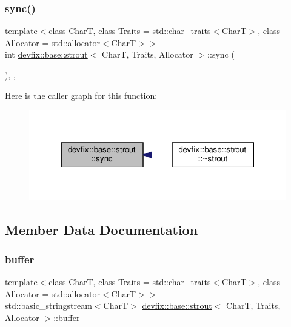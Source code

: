 \subsubsection{\texorpdfstring{sync()}{sync()}}
{\footnotesize\ttfamily template$<$class CharT, class Traits = std\+::char\+\_\+traits$<$\+Char\+T$>$, class Allocator = std\+::allocator$<$\+Char\+T$>$$>$ \\
int \hyperlink{structdevfix_1_1base_1_1strout}{devfix\+::base\+::strout}$<$ CharT, Traits, Allocator $>$\+::sync (\begin{DoxyParamCaption}{ }\end{DoxyParamCaption})\hspace{0.3cm}{\ttfamily [inline]}, {\ttfamily [override]}, {\ttfamily [protected]}}

Here is the caller graph for this function\+:\nopagebreak
\begin{figure}[H]
\begin{center}
\leavevmode
\includegraphics[width=318pt]{structdevfix_1_1base_1_1strout_a50b305dcf9905bfe75fa1bba42718169_icgraph}
\end{center}
\end{figure}


\subsection{Member Data Documentation}
\mbox{\label{structdevfix_1_1base_1_1strout_a0625f5cbd10441a4613bf3aae5ab15a1}} 
\subsubsection{\texorpdfstring{buffer\+\_\+}{buffer\_}}
{\footnotesize\ttfamily template$<$class CharT, class Traits = std\+::char\+\_\+traits$<$\+Char\+T$>$, class Allocator = std\+::allocator$<$\+Char\+T$>$$>$ \\
std\+::basic\+\_\+stringstream$<$CharT$>$ \hyperlink{structdevfix_1_1base_1_1strout}{devfix\+::base\+::strout}$<$ CharT, Traits, Allocator $>$\+::buffer\+\_\+\hspace{0.3cm}{\ttfamily [protected]}}

